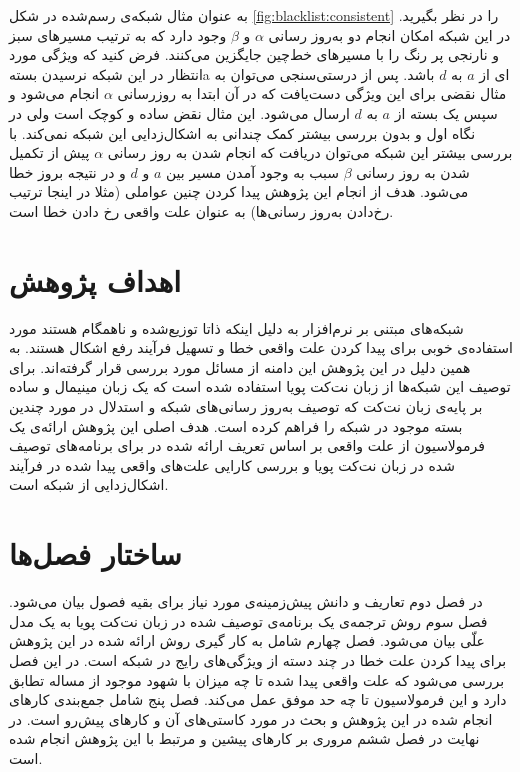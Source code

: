به عنوان مثال شبکه‌ی رسم‌شده در شکل
\ref{fig:blacklist:consistent}
را در نظر بگیرید.
در این شبکه امکان انجام دو به‌روز رسانی 
$\alpha$
و
$\beta$
وجود دارد که به ترتیب مسیر‌های سبز و نارنجی پر رنگ‌ را با مسیر‌های خط‌چین جایگزین ‌می‌کنند.
فرض کنید که ویژگی مورد انتظار در این شبکه نرسیدن بسته‌a
ای از 
$a$
به
$d$
باشد.
پس از درستی‌سنجی می‌توان به مثال نقضی برای این ویژگی دست‌یافت که در آن ابتدا 
به روزرسانی 
$\alpha$
انجام می‌شود و سپس یک بسته از 
$a$
به 
$d$
ارسال می‌شود.
این مثال نقض ساده و کوچک است ولی در نگاه اول و بدون بررسی بیشتر کمک چندانی به اشکال‌زدایی این شبکه نمی‌کند.
با بررسی بیشتر این شبکه می‌توان دریافت که انجام شدن به روز رسانی
$\alpha$
پیش از تکمیل شدن به روز رسانی
$\beta$
سبب به وجود آمدن مسیر بین 
$a$
و
$d$
و در نتیجه بروز خطا می‌شود.
هدف از انجام این پژوهش پیدا کردن چنین عواملی 
(مثلا در اینجا ترتیب رخ‌دادن به‌روز رسانی‌ها)
به عنوان علت واقعی رخ دادن خطا است.

\section{اهداف پژوهش}
شبکه‌های مبتنی بر نرم‌افزار به دلیل اینکه ذاتا توزیع‌شده و ناهمگام هستند مورد استفاده‌ی خوبی برای پیدا کردن علت واقعی خطا و تسهیل فرآیند رفع اشکال هستند. 
به همین دلیل در این پژوهش این دامنه از مسائل مورد بررسی قرار گرفته‌اند.
برای توصیف این شبکه‌ها از زبان نت‌کت پویا
 \cite{dynetkat}
استفاده شده است که یک زبان مینیمال و ساده بر پایه‌ی زبان نت‌کت
 \cite{netkat}
که توصیف به‌روز‌ رسانی‌های شبکه و استدلال در مورد چندین بسته موجود در شبکه را فراهم کرده است.
هدف اصلی این پژوهش ارائه‌ی یک فرمولاسیون از علت واقعی
بر اساس تعریف ارائه شده در
\cite{hp}
برای برنامه‌های توصیف شده در زبان نت‌کت پویا و بررسی کارایی علت‌های واقعی پیدا شده در فرآیند اشکال‌زدایی از شبکه است.

\section{ساختار فصل‌ها}
در فصل دوم تعاریف و دانش پیش‌زمینه‌ی مورد نیاز برای بقیه فصول بیان می‌شود.
فصل سوم روش ترجمه‌ی یک برنامه‌ی توصیف شده در زبان نت‌کت پویا به یک مدل علّی
بیان می‌شود.
فصل چهارم شامل به کار گیری روش ارائه شده در این پژوهش برای پیدا کردن علت خطا در چند دسته از ویژگی‌های رایج در شبکه است. در این فصل بررسی می‌شود که علت واقعی پیدا شده تا چه میزان با شهود موجود از مساله تطابق دارد و این فرمولاسیون تا چه حد موفق عمل می‌کند.
فصل پنج شامل جمع‌بندی کار‌های انجام شده در این پژوهش و بحث در مورد کاستی‌های آن و کار‌های پیش‌رو است.
در نهایت در فصل ششم مروری بر کار‌های پیشین و مرتبط با این پژوهش انجام شده است.